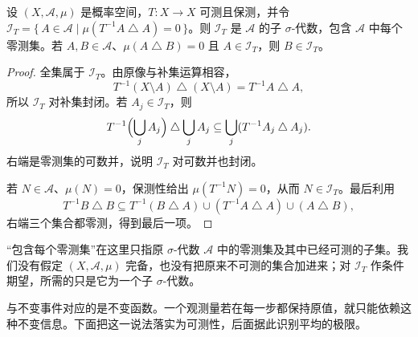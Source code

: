 \begin{proposition}[不变事件构成子代数]\label{b1:prop:invariant-sigma-32}
设 \((X,\mathcal A,\mu)\) 是概率空间，\(T\colon X\rightarrow X\) 可测且保测，并令
\(\mathcal I_T=\{\,A\in\mathcal A\mid\mu(T^{-1}A\mathbin{\triangle}A)=0\,\}\)。则 \(\mathcal I_T\) 是 \(\mathcal A\) 的子 \(\sigma\)-代数，包含 \(\mathcal A\) 中每个零测集。若 \(A,B\in\mathcal A\)、\(\mu(A\mathbin{\triangle}B)=0\) 且 \(A\in\mathcal I_T\)，则 \(B\in\mathcal I_T\)。
\end{proposition}
\begin{proof}
全集属于 \(\mathcal I_T\)。由原像与补集运算相容，
\[
 T^{-1}(X\setminus A)\mathbin{\triangle}(X\setminus A)
 =T^{-1}A\mathbin{\triangle}A,
\]
所以 \(\mathcal I_T\) 对补集封闭。若 \(A_j\in\mathcal I_T\)，则
\[
 T^{-1}\Bigl(\bigcup_j A_j\Bigr)\mathbin{\triangle}\bigcup_j A_j
 \subseteq\bigcup_j(T^{-1}A_j\mathbin{\triangle}A_j).
\]
右端是零测集的可数并，说明 \(\mathcal I_T\) 对可数并也封闭。

若 \(N\in\mathcal A\)、\(\mu(N)=0\)，保测性给出 \(\mu(T^{-1}N)=0\)，从而 \(N\in\mathcal I_T\)。最后利用
\[
 T^{-1}B\mathbin{\triangle}B
 \subseteq T^{-1}(B\mathbin{\triangle}A)
 \cup(T^{-1}A\mathbin{\triangle}A)\cup(A\mathbin{\triangle}B),
\]
右端三个集合都零测，得到最后一项。
\end{proof}

“包含每个零测集”在这里只指原 \(\sigma\)-代数 \(\mathcal A\) 中的零测集及其中已经可测的子集。我们没有假定 \((X,\mathcal A,\mu)\) 完备，也没有把原来不可测的集合加进来；对 \(\mathcal I_T\) 作条件期望，所需的只是它为一个子 \(\sigma\)-代数。

\ProseParagraphBreak

与不变事件对应的是不变函数。一个观测量若在每一步都保持原值，就只能依赖这种不变信息。下面把这一说法落实为可测性，后面据此识别平均的极限。

